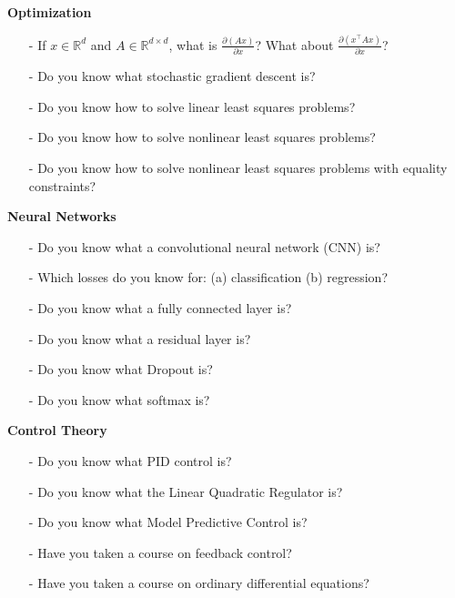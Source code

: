 \documentclass{article}
\begin{document}
\quad
\newline
\noindent \textbf{Optimization}
\newline
\begin{itemize}
\item[-] If $x \in \mathbb{R}^d$ and $A \in \mathbb{R}^{d \times d}$, what is $\frac{\partial (Ax)}{\partial x}$? What about $\frac{\partial (x^\top Ax)}{\partial x}$?
\item[-] Do you know what stochastic gradient descent is?
\item[-] Do you know how to solve linear least squares problems?
\item[-] Do you know how to solve nonlinear least squares problems?
\item[-] Do you know how to solve nonlinear least squares problems with equality constraints?
\end{itemize}
\newline
\quad
\newline
\noindent \textbf{Neural Networks}
\newline
\begin{itemize}
\item[-] Do you know what a convolutional neural network (CNN) is?
\item[-] Which losses do you know for: (a) classification (b) regression?
\item[-] Do you know what a fully connected layer is?
\item[-] Do you know what a residual layer is?
\item[-] Do you know what Dropout is?
\item[-] Do you know what softmax is?
\end{itemize}
\newline
\newline
\quad
\newline
\noindent \textbf{Control Theory}
\newline
\begin{itemize}
\item[-] Do you know what PID control is?
\item[-] Do you know what the Linear Quadratic Regulator is?
\item[-] Do you know what Model Predictive Control is?
\item[-] Have you taken a course on feedback control?
\item[-] Have you taken a course on ordinary differential equations?
\end{itemize}
\newline
\end{document}
